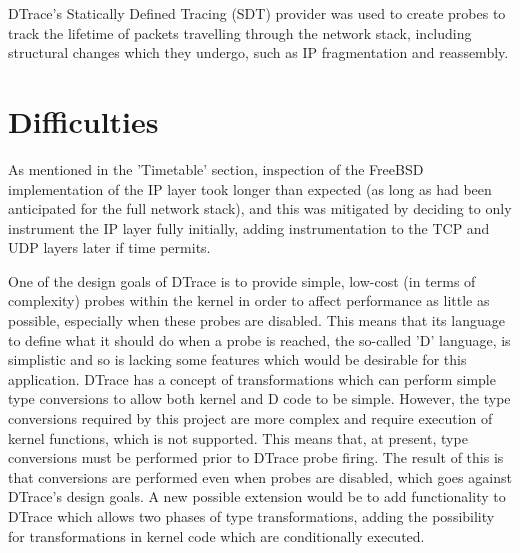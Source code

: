 \documentclass[a4paper,12pt,twoside,openright]{report}
\begin{document}
	DTrace's Statically Defined Tracing (SDT) provider was used to create probes to track the lifetime of packets travelling through the network stack, including structural changes which they undergo, such as IP fragmentation and reassembly.
	
	\section{Difficulties}
	
	As mentioned in the 'Timetable' section, inspection of the FreeBSD implementation of the IP layer took longer than expected (as long as had been anticipated for the full network stack), and this was mitigated by deciding to only instrument the IP layer fully initially, adding instrumentation to the TCP and UDP layers later if time permits.
	
	One of the design goals of DTrace is to provide simple, low-cost (in terms of complexity) probes within the kernel in order to affect performance as little as possible, especially when these probes are disabled. This means that its language to define what it should do when a probe is reached, the so-called 'D' language, is simplistic and so is lacking some features which would be desirable for this application. DTrace has a concept of transformations which can perform simple type conversions to allow both kernel and D code to be simple. However, the type conversions required by this project are more complex and require execution of kernel functions, which is not supported. This means that, at present, type conversions must be performed prior to DTrace probe firing. The result of this is that conversions are performed even when probes are disabled, which goes against DTrace's design goals. A new possible extension would be to add functionality to DTrace which allows two phases of type transformations, adding the possibility for transformations in kernel code which are conditionally executed.
	
\end{document}

